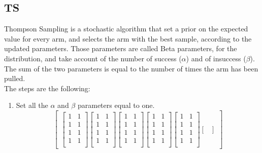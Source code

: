 \subsection{TS}
Thompson Sampling is a stochastic algorithm that set a prior on the expected value for every arm, and selects the arm with the best sample, according to the updated parameters. Those parameters are called Beta parameters, for the distribution, and take account of the number of success ($\alpha$) and of insuccess ($\beta$). The sum of the two parameters is equal to the number of times the arm has been pulled.\\The steps are the following:
\begin{enumerate}
    \item Set all the $\alpha$ and $\beta$ parameters equal to one. \[\begin{bmatrix}
    \begin{bmatrix}
        1 & 1\\
        1 & 1\\
        1 & 1\\
        1 & 1\\
    \end{bmatrix}
    \begin{bmatrix}
        1 & 1\\
        1 & 1\\
        1 & 1\\
        1 & 1\\
    \end{bmatrix}
    \begin{bmatrix}
        1 & 1\\
        1 & 1\\
        1 & 1\\
        1 & 1\\
    \end{bmatrix}
    \begin{bmatrix}
        1 & 1\\
        1 & 1\\
        1 & 1\\
        1 & 1\\
    \end{bmatrix}
    \begin{bmatrix}
        1 & 1\\
        1 & 1\\
        1 & 1\\
        1 & 1\\
    \end{bmatrix}
    \begin{bmatrix}

\end{bmatrix}
\end{bmatrix}\]
\end{enumerate}
